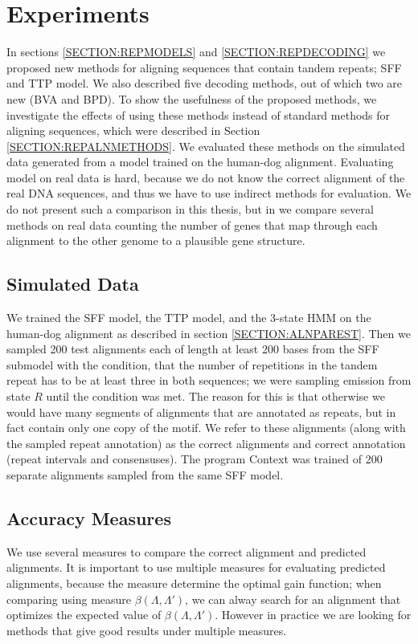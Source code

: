 \section{Experiments}
In sections \ref{SECTION:REPMODELS} and \ref{SECTION:REPDECODING} we proposed
new methods for aligning sequences that contain tandem repeats; SFF and TTP
model.  We also described five decoding methods, out of which two are new (BVA
and BPD). To show the usefulness of the proposed methods, we investigate the
effects of using these methods instead of standard methods for aligning
sequences, which were described in Section \ref{SECTION:REPALNMETHODS}. We 
evaluated these methods on the simulated data generated from a model trained on the human-dog alignment. 
Evaluating model on real data is hard, because we do not know the correct
alignment of the real DNA sequences, and thus we have to use indirect methods for
evaluation. We do not present such a comparison in this thesis, but  in \cite{Nanasi2014}
we compare several methods on real data counting the number of genes that map
through each alignment to the other genome to a plausible gene structure.


\subsection{Simulated Data}
We trained the SFF model, the TTP model, and the 3-state HMM on the human-dog
alignment as described in section \ref{SECTION:ALNPAREST}. Then we sampled 200
test alignments each of length at least 200 bases from the SFF submodel with
the condition, that the number of repetitions in the tandem repeat has to be at
least three in both sequences; we were sampling emission from state $R$ until
the condition was met. The reason for this is that otherwise we would have many
segments of alignments that are annotated as repeats, but in fact contain only
one copy of the motif. We refer to these alignments (along with the sampled
repeat annotation) as the correct alignments and correct annotation (repeat
intervals and consensuses).  The program Context \cite{Hickey2011} was trained
of 200 separate alignments sampled from the same SFF model.

\subsection{Accuracy Measures}
We use several measures to compare the correct alignment and predicted alignments.
It is important to use multiple measures for evaluating predicted alignments,
because the measure determine the optimal gain function; when comparing using
measure $\beta(\Lambda, \Lambda')$, we can alway search for an alignment that
optimizes the expected value of $\beta(\Lambda, \Lambda')$. 
However in practice we are looking for methods that give good results under 
multiple measures.

